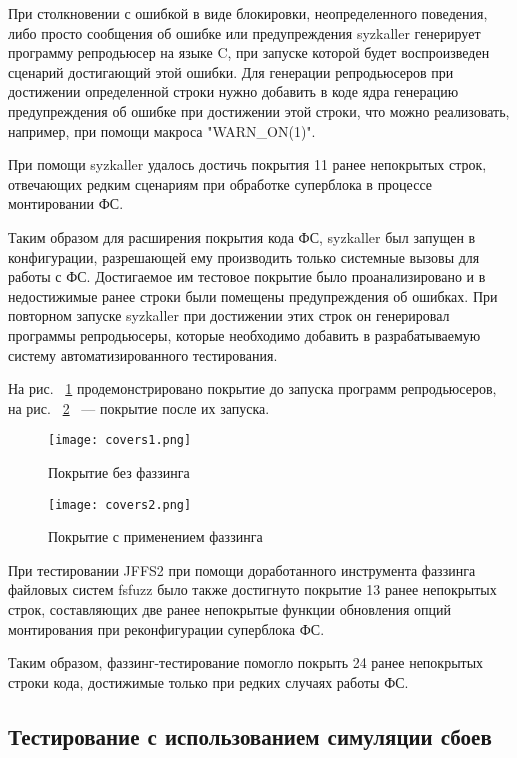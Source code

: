 При столкновении с ошибкой в виде блокировки, неопределенного поведения, либо просто сообщения об ошибке или предупреждения syzkaller генерирует программу репродьюсер на языке C, при запуске которой будет воспроизведен сценарий достигающий этой ошибки. Для генерации репродьюсеров при достижении определенной строки нужно добавить в коде ядра генерацию предупреждения об ошибке при достижении этой строки, что можно реализовать, например, при помощи макроса "WARN\_ON(1)".

При помощи syzkaller удалось достичь покрытия 11 ранее непокрытых строк, отвечающих редким сценариям при обработке суперблока в процессе монтировании ФС.

Таким образом для расширения покрытия кода ФС, syzkaller был запущен в конфигурации, разрешающей ему производить только системные вызовы для работы с ФС. Достигаемое им тестовое покрытие было проанализировано и в недостижимые ранее строки были помещены предупреждения об ошибках. При повторном запуске syzkaller при достижении этих строк он генерировал программы репродьюсеры, которые необходимо добавить в разрабатываемую систему автоматизированного тестирования.

На рис. ~\ref{covers1} продемонстрировано покрытие до запуска программ репродьюсеров, на рис. ~\ref{covers2} ~--- покрытие после их запуска.

\begin{figure}[H]
	\centering
	\texttt{[image: covers1.png]}
	\caption{Покрытие без фаззинга}
	\label{covers1}
\end{figure}

\begin{figure}[H]
	\centering
	\texttt{[image: covers2.png]}
	\caption{Покрытие с применением фаззинга}
	\label{covers2}
\end{figure}

При тестировании JFFS2 при помощи доработанного инструмента фаззинга файловых систем fsfuzz было также достигнуто покрытие 13 ранее непокрытых строк, составляющих две ранее непокрытые функции обновления опций монтирования при реконфигурации суперблока ФС.

Таким образом, фаззинг-тестирование помогло покрыть 24 ранее непокрытых строки кода, достижимые только при редких случаях работы ФС.

\subsection{Тестирование с использованием симуляции сбоев}

